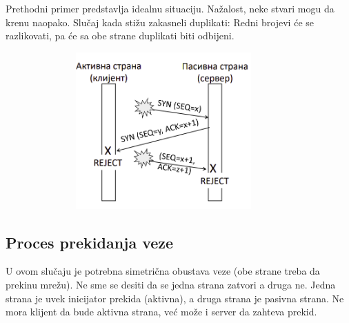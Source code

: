 \documentclass[a4paper]{article}
\begin{document}
        Prethodni primer predstavlja idealnu situaciju. Nažalost, neke stvari mogu da krenu naopako.
        Slučaj kada stižu zakasneli duplikati: Redni brojevi će se razlikovati, pa će sa obe strane
        duplikati biti odbijeni.
        \begin{figure}[H]
            \begin{center}
                \includegraphics[width=100mm,height=60mm]{Slike/uspostava_konekcije2.png}
            \end{center}
        \end{figure}

    \subsection{Proces prekidanja veze}
        U ovom slučaju je potrebna simetrična obustava veze (obe strane treba da prekinu mrežu). 
        Ne sme se desiti da se jedna strana zatvori a druga ne. Jedna strana je uvek inicijator
        prekida (aktivna), a druga strana je pasivna strana. Ne mora klijent da bude aktivna strana, 
        već može i server da zahteva prekid.
        
\end{document}
